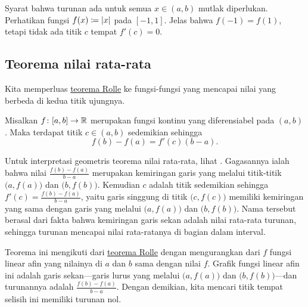Syarat bahwa turunan ada untuk semua $x
\in (a,b)$ mutlak diperlukan.  Perhatikan fungsi $f(x) \coloneqq \lvert {x} \rvert$ pada $[-1,1]$.
Jelas bahwa $f(-1) = f(1)$, tetapi tidak ada titik $c$ tempat $f'(c) = 0$.

\subsection{Teorema nilai rata-rata}

Kita memperluas \hyperref[thm:rolle]{teorema Rolle}
ke fungsi-fungsi yang mencapai nilai yang berbeda
di kedua titik ujungnya.

\begin{thm} \label{thm:mvt}
Misalkan $f \colon [a,b] \to {\mathbb{R}}$ merupakan fungsi kontinu yang
diferensiabel pada $(a,b)$.  Maka terdapat titik $c \in (a,b)$
sedemikian sehingga
\begin{equation*}
f(b)-f(a) = f'(c)(b-a) .
\end{equation*}
\end{thm}

Untuk interpretasi geometris teorema nilai rata-rata, lihat
.  Gagasannya ialah bahwa nilai $\frac{f(b)-f(a)}{b-a}$
merupakan kemiringan garis yang melalui titik-titik $\bigl(a,f(a)\bigr)$
dan $\bigl(b,f(b)\bigr)$.
Kemudian $c$ adalah titik sedemikian sehingga $f'(c) = \frac{f(b)-f(a)}{b-a}$, yaitu 
garis singgung di titik $\bigl(c,f(c)\bigr)$ memiliki kemiringan yang sama dengan
garis yang melalui $\bigl(a,f(a)\bigr)$ dan $\bigl(b,f(b)\bigr)$.
Nama tersebut berasal dari fakta bahwa kemiringan garis sekan
adalah nilai rata-rata turunan, sehingga turunan mencapai nilai rata-ratanya
di bagian dalam interval.

Teorema ini mengikuti dari \hyperref[thm:rolle]{teorema Rolle}
dengan mengurangkan dari $f$ fungsi linear afin
yang nilainya di $a$ dan $b$ sama dengan nilai $f$.
Grafik fungsi linear afin ini adalah 
garis sekan---garis lurus yang melalui
$\bigl(a,f(a)\bigr)$ dan $\bigl(b,f(b)\bigr)$---dan
turunannya adalah
$\frac{f(b)-f(a)}{b-a}$.
Dengan demikian, kita mencari titik tempat
selisih ini memiliki turunan nol.

\begin{myfigureht}
\caption{Interpretasi grafis teorema nilai rata-rata.\label{mvtfig}}
\end{myfigureht}


